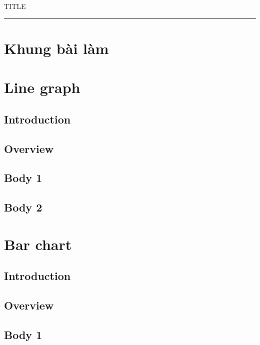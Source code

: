 \documentclass[11pt,a4paper]{article}
\begin{document}
{\small\sffamily\color{teal} {{TITLE}}}\par\hrule\medskip
\section*{Khung bài làm}
\section*{Line graph}
\subsection*{Introduction}
\vspace{1cm}
\subsection*{Overview}
\vspace{1cm}
\subsection*{Body 1}
\vspace{1cm}
\subsection*{Body 2}
\vspace{1cm}
\clearpage
\section*{Bar chart}
\subsection*{Introduction}
\vspace{1cm}
\subsection*{Overview}
\vspace{1cm}
\subsection*{Body 1}
\vspace{1cm}
\end{document}
